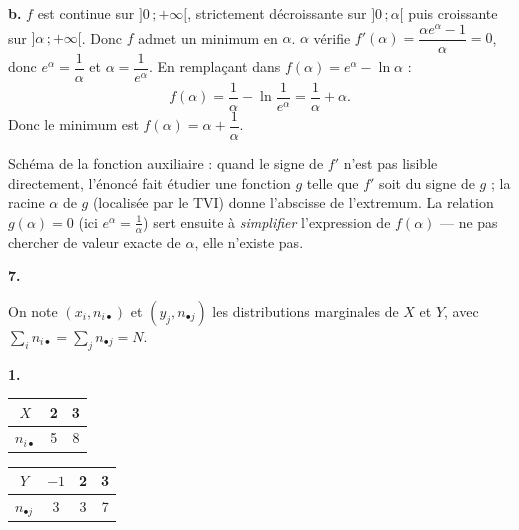 \documentclass[11pt]{article}
\begin{document}
\textbf{b.} $f$ est continue sur $]0\,;+\infty[$, strictement décroissante sur $]0\,;\alpha[$ puis croissante sur $]\alpha\,;+\infty[$. Donc $f$ admet un minimum en $\alpha$. $\alpha$ vérifie $f'(\alpha) = \dfrac{\alpha e^\alpha - 1}{\alpha} = 0$, donc $e^\alpha = \dfrac{1}{\alpha}$ et $\alpha = \dfrac{1}{e^\alpha}$. En remplaçant dans $f(\alpha) = e^\alpha - \ln\alpha$ :
\[ f(\alpha) = \frac{1}{\alpha} - \ln\frac{1}{e^\alpha} = \frac{1}{\alpha} + \alpha. \]
Donc le minimum est $f(\alpha) = \alpha + \dfrac{1}{\alpha}$.

\begin{methode}
Schéma de la fonction auxiliaire : quand le signe de $f'$ n'est pas
lisible directement, l'énoncé fait étudier une fonction $g$ telle que
$f'$ soit du signe de $g$ ; la racine $\alpha$ de $g$ (localisée par le
TVI) donne l'abscisse de l'extremum. La relation $g(\alpha) = 0$ (ici
$e^\alpha = \frac{1}{\alpha}$) sert ensuite à \emph{simplifier}
l'expression de $f(\alpha)$ — ne pas chercher de valeur exacte de
$\alpha$, elle n'existe pas.
\end{methode}

\textbf{7.} \begin{center}
\end{center}


On note $(x_i, n_{i\bullet})$ et $(y_j, n_{\bullet j})$ les distributions marginales de $X$ et $Y$, avec $\sum_i n_{i\bullet} = \sum_j n_{\bullet j} = N$.

\textbf{1.}
\begin{center}\renewcommand{\arraystretch}{1.3}
\begin{tabular}{|c|c|c|}\hline $X$ & 2 & 3 \\\hline $n_{i\bullet}$ & 5 & 8 \\\hline\end{tabular}
\qquad
\begin{tabular}{|c|c|c|c|}\hline $Y$ & $-1$ & 2 & 3 \\\hline $n_{\bullet j}$ & 3 & 3 & 7 \\\hline\end{tabular}
\end{center}
\end{document}
